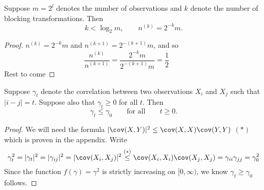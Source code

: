\documentclass[11pt,english,a4paper]{article}
\begin{document}
\begin{lemma} Suppose $m = 2^l$ denotes the number of observations and $k$ denote the number of blocking transformations. Then
\[
k < \log_2m, \qquad n^{(k)} = 2^{-k}m.
\]\label{lemma:k}
\end{lemma}
\begin{proof}
$n^{(k)} = 2^{-k}m$ and $n^{(k+1)} = 2^{-(k+1)}m$, and so
\[
\frac{n^{(k)}}{n^{(k+1)}} = \frac{2^{-k}m}{2^{-(k+1)}m} = \frac{1}{2} \qquad %
\]  
Rest to come
\end{proof}
\begin{lemma} Suppose $\gamma_t$ denote the correlation between two observations $X_i$ and $X_j$ such that $|i-j| = t$. Suppose also that $\gamma_t \geq 0$ for all $t$. Then 
\[
\gamma_t \leq \gamma_0 \qquad \text{for all} \qquad t \geq 0.
\]
\end{lemma}
\begin{proof}
We will need the formula $| \cov (X,Y) |^2 \leq \cov (X,X) \cov (Y,Y)$ $(*)$ which is proven in the appendix. Write
\[
\gamma_{t}^2 = |\gamma_t|^2 = |\gamma_{ij}|^2 = | \cov (X_i,X_j) |^2 \stackrel{(*)}{\leq} \cov (X_i,X_i) \cov (X_j,X_j) = \gamma_{ii}\gamma_{jj} = \gamma_0^2
\]
Since the function $f(\gamma) = \gamma^2$ is strictly increasing on $[0,\infty)$, we know $\gamma_t \geq \gamma_0$ follows.
\end{proof}
\end{document}
